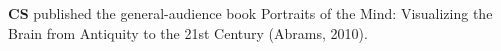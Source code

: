 \textbf{CS} published the general-audience book Portraits of the Mind: Visualizing the Brain from Antiquity to the 21st Century (Abrams, 2010).
